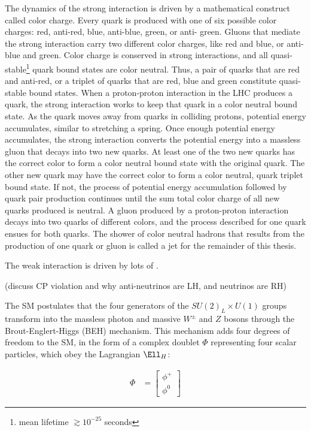 The dynamics of the strong interaction is driven by a mathematical construct called color charge.  Every 
quark is produced with one of six possible color charges: red, anti-red, blue, anti-blue, green, or anti-
green.  Gluons that mediate the strong interaction carry two different color charges, like red and blue, 
or anti-blue and green.  Color charge is conserved in strong interactions, and all quasi-
stable\footnote{mean lifetime $\gtrsim 10^{-25}$ seconds} quark bound states 
are color neutral.  Thus, a pair of quarks that are red and anti-red, or a triplet of quarks that are 
red, blue and green constitute quasi-stable bound states.  When a proton-proton interaction in the LHC 
produces a quark, the strong interaction works to keep that quark in a color neutral bound state.  As the 
quark moves away from quarks in colliding protons, potential energy accumulates, similar to stretching a 
spring.  Once enough potential energy accumulates, the strong interaction converts the potential energy 
into a massless gluon that decays into two new quarks.  At least one of the two new quarks has 
the correct color to form a color neutral bound state with the original quark.  The other new quark may 
have the correct color to form a color neutral, quark triplet bound state.  If not, the process of 
potential energy accumulation followed by quark pair production continues until the sum total color 
charge of all new quarks produced is neutral.  A gluon produced by a proton-proton interaction 
decays into two quarks of different colors, and the process described for one quark ensues for both 
quarks.  The shower of color neutral hadrons that results from the production of one quark or gluon 
is called a jet for the remainder of this thesis.

The weak interaction is driven by lots of .

(discuss CP violation and why anti-neutrinos are LH, and neutrinos are RH)


The SM postulates that the four generators of the $SU(2)_{L} \times U(1)$ groups transform into the massless 
photon and massive $W^{\pm}$ and $Z$ bosons through the Brout-Englert-Higgs (BEH) mechanism.  This mechanism 
adds four degrees of freedom to the SM, in the form of a complex doublet $\Phi$ representing four scalar 
particles, which obey the Lagrangian $\Ell_{H}$:

\begin{align}
	\Phi &= \begin{bmatrix}
	\phi^{+} \\
	\phi^{0}
	\end{bmatrix}
\end{align}

